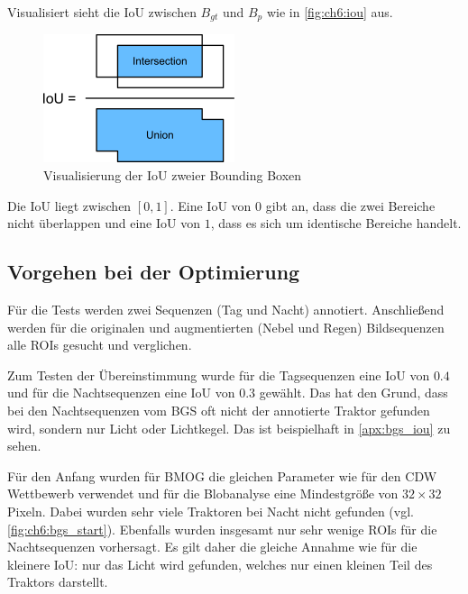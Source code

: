 Visualisiert sieht die \ac{IoU} zwischen $B_{gt}$ und $B_p$ wie in \autoref{fig:ch6:iou} aus.
\begin{figure}[ht]
    \center
    \includegraphics[width=0.5\textwidth]{figures/chapter_6/iou}
    \caption{Visualisierung der IoU zweier Bounding Boxen}
    \label{fig:ch6:iou}
\end{figure}

Die \ac{IoU} liegt zwischen $[0,1]$.
Eine \ac{IoU} von $0$ gibt an, dass die zwei Bereiche nicht überlappen und eine \ac{IoU} von $1$, dass es sich um identische Bereiche handelt.

\subsection{Vorgehen bei der Optimierung} \label{ch6:bgs_opti}
Für die Tests werden zwei Sequenzen (Tag und Nacht) annotiert.
Anschließend werden für die originalen und augmentierten (Nebel und Regen) Bildsequenzen alle \acp{ROI} gesucht und verglichen.

Zum Testen der Übereinstimmung wurde für die Tagsequenzen eine \ac{IoU} von $0.4$ und für die Nachtsequenzen eine \ac{IoU} von $0.3$ gewählt.
Das hat den Grund, dass bei den Nachtsequenzen vom \ac{BGS} oft nicht der annotierte Traktor gefunden wird, sondern nur Licht oder Lichtkegel.
Das ist beispielhaft in \autoref{apx:bgs_iou} zu sehen.

\bigskip
Für den Anfang wurden für \ac{BMOG} die gleichen Parameter wie für den \ac{CDW} Wettbewerb verwendet und für die Blobanalyse eine Mindestgröße von $32 \times 32$ Pixeln.
Dabei wurden sehr viele Traktoren bei Nacht nicht gefunden (vgl. \autoref{fig:ch6:bgs_start}).
Ebenfalls wurden insgesamt nur sehr wenige \acp{ROI} für die Nachtsequenzen vorhersagt.
Es gilt daher die gleiche Annahme wie für die kleinere \ac{IoU}: nur das Licht wird gefunden, welches nur einen kleinen Teil des Traktors darstellt.

